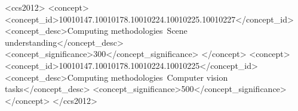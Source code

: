 \begin{CCSXML}
<ccs2012>
   <concept>
       <concept_id>10010147.10010178.10010224.10010225.10010227</concept_id>
       <concept_desc>Computing methodologies~Scene understanding</concept_desc>
       <concept_significance>300</concept_significance>
       </concept>
   <concept>
       <concept_id>10010147.10010178.10010224.10010225</concept_id>
       <concept_desc>Computing methodologies~Computer vision tasks</concept_desc>
       <concept_significance>500</concept_significance>
       </concept>
 </ccs2012>
\end{CCSXML}

